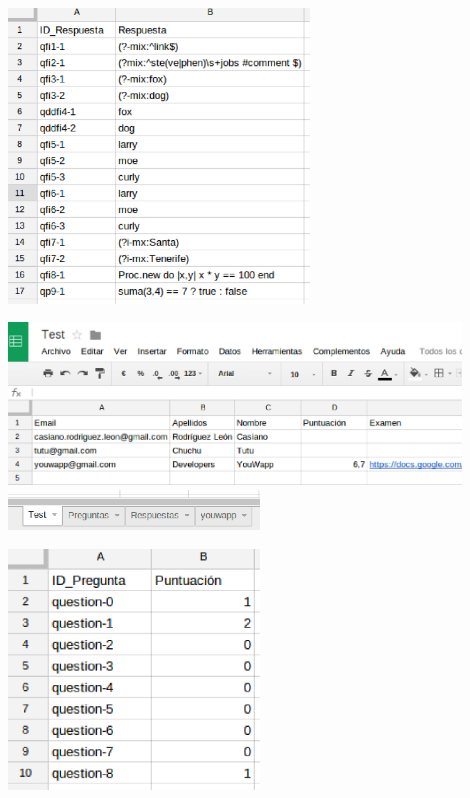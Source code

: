 \documentclass{beamer}
\begin{document}
\begin{frame}[allowframebreaks]
\begin{itemize}
    \begin{center}
      \includegraphics[width=0.6\textwidth]{img/app4.eps}
    \end{center}
    \framebreak
    
    \begin{center}
      \includegraphics[width=0.9\textwidth]{img/app1.eps} \\
      \bigskip
      \includegraphics[width=0.5\textwidth]{img/app2.eps}
    \end{center}
    \framebreak
    
    \begin{center}
      \includegraphics[width=0.5\textwidth]{img/app5.eps}
    \end{center}
    
  \end{itemize}
\end{frame}
\end{document}
